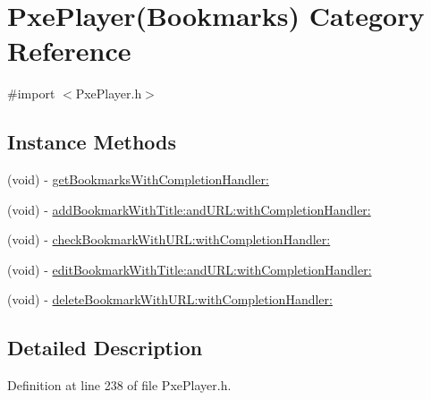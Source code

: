 \hypertarget{category_pxe_player_07_bookmarks_08}{\section{Pxe\-Player(Bookmarks) Category Reference}
\label{category_pxe_player_07_bookmarks_08}
}


{\ttfamily \#import $<$Pxe\-Player.\-h$>$}

\subsection*{Instance Methods}
\begin{DoxyCompactItemize}
\item 
(void) -\/ \hyperlink{category_pxe_player_07_bookmarks_08_adf67269a9769654658af61f2f897a8b8}{get\-Bookmarks\-With\-Completion\-Handler\-:}
\item 
(void) -\/ \hyperlink{category_pxe_player_07_bookmarks_08_ad4c6c1fcc23ebfdc02eecaa3d1de4c9f}{add\-Bookmark\-With\-Title\-:and\-U\-R\-L\-:with\-Completion\-Handler\-:}
\item 
(void) -\/ \hyperlink{category_pxe_player_07_bookmarks_08_ad3d6230226f923cdca730348588d6f82}{check\-Bookmark\-With\-U\-R\-L\-:with\-Completion\-Handler\-:}
\item 
(void) -\/ \hyperlink{category_pxe_player_07_bookmarks_08_a78ee75ca33ea7b6a2da7a5df32bffe7d}{edit\-Bookmark\-With\-Title\-:and\-U\-R\-L\-:with\-Completion\-Handler\-:}
\item 
(void) -\/ \hyperlink{category_pxe_player_07_bookmarks_08_ac0571c27d0176f77e2ab5032dad9d2d1}{delete\-Bookmark\-With\-U\-R\-L\-:with\-Completion\-Handler\-:}
\end{DoxyCompactItemize}


\subsection{Detailed Description}


Definition at line 238 of file Pxe\-Player.\-h.



